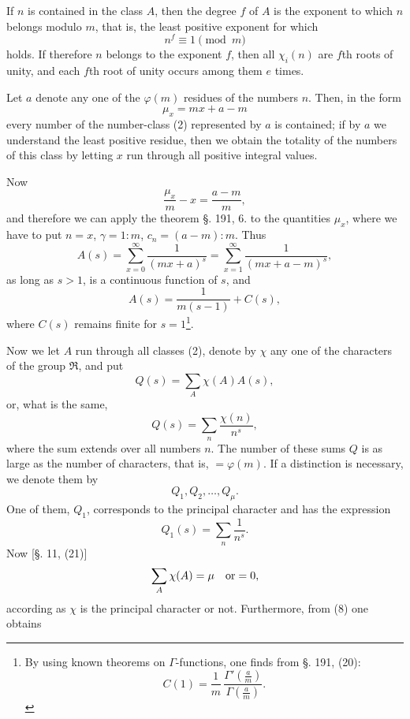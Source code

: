 \documentclass[11pt]{article}
\begin{document}
If $n$ is contained in the class $A$, then the degree $f$ of $A$ is the exponent to which $n$ belongs modulo $m$, that is, the least positive exponent for which
\begin{equation}\tag{5}
n^f\equiv1 \pmod m
\end{equation}
holds. If therefore $n$ belongs to the exponent $f$, then all $\chi_i(n)$ are $f$th roots of unity, and each $f$th root of unity occurs among them $e$ times.

Let $a$ denote any one of the $\varphi(m)$ residues of the numbers $n$. Then, in the form
\begin{equation}\tag{6}
\mu_x=mx+a-m
\end{equation}
every number of the number-class (2) represented by $a$ is contained; if by $a$ we understand the least positive residue, then we obtain the totality of the numbers of this class by letting $x$ run through all positive integral values.

Now
\[
\frac{\mu_x}{m}-x=\frac{a-m}{m},
\]
and therefore we can apply the theorem §. 191, 6. to the quantities $\mu_x$, where we have to put $n=x$, $\gamma=1:m$, $c_n=(a-m):m$. Thus
\begin{equation}\tag{7}
A(s)=\sum_{x=0}^{\infty}\frac{1}{(mx+a)^s}
     =\sum_{x=1}^{\infty}\frac{1}{(mx+a-m)^s},
\end{equation}
as long as $s>1$, is a continuous function of $s$, and
\begin{equation}\tag{8}
A(s)=\frac{1}{m(s-1)}+C(s),
\end{equation}
where $C(s)$ remains finite for $s=1$\footnote{By using known theorems on $\Gamma$-functions, one finds from §. 191, (20):
\[
C(1)=\frac1m\,\frac{\Gamma'\!\left(\frac am\right)}{\Gamma\!\left(\frac am\right)}.
\]
}.

Now we let $A$ run through all classes (2), denote by $\chi$ any one of the characters of the group $\mathfrak R$, and put
\begin{equation}\tag{9}
Q(s)=\sum_A \chi(A)A(s),
\end{equation}
or, what is the same,
\begin{equation}\tag{10}
Q(s)=\sum_n \frac{\chi(n)}{n^s},
\end{equation}
where the sum extends over all numbers $n$. The number of these sums $Q$ is as large as the number of characters, that is, $=\varphi(m)$. If a distinction is necessary, we denote them by
\[
Q_1,Q_2,\ldots,Q_\mu.
\]
One of them, $Q_1$, corresponds to the principal character and has the expression
\[
Q_1(s)=\sum_n\frac1{n^s}.
\]
Now [§. 11, (21)]
\[
\sum_A \chi(A)=\mu\quad \hbox{or}=0,
\]
according as $\chi$ is the principal character or not. Furthermore, from (8) one obtains
\end{document}
